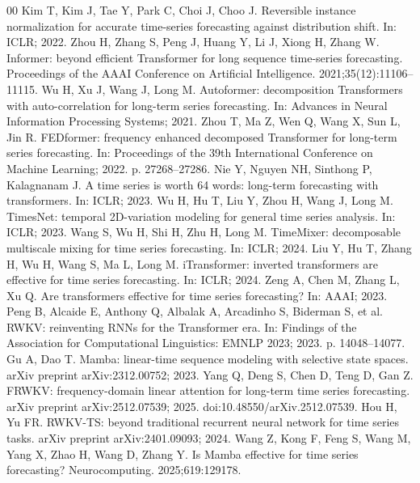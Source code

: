 \documentclass[a4paper,fleqn]{cas-sc}
\begin{document}
\begin{thebibliography}{00}
 Kim T, Kim J, Tae Y, Park C, Choi J, Choo J. Reversible instance normalization for accurate time-series forecasting against distribution shift. In: ICLR; 2022.
 Zhou H, Zhang S, Peng J, Huang Y, Li J, Xiong H, Zhang W. Informer: beyond efficient Transformer for long sequence time-series forecasting. Proceedings of the AAAI Conference on Artificial Intelligence. 2021;35(12):11106--11115.
 Wu H, Xu J, Wang J, Long M. Autoformer: decomposition Transformers with auto-correlation for long-term series forecasting. In: Advances in Neural Information Processing Systems; 2021.
 Zhou T, Ma Z, Wen Q, Wang X, Sun L, Jin R. FEDformer: frequency enhanced decomposed Transformer for long-term series forecasting. In: Proceedings of the 39th International Conference on Machine Learning; 2022. p. 27268--27286.
 Nie Y, Nguyen NH, Sinthong P, Kalagnanam J. A time series is worth 64 words: long-term forecasting with transformers. In: ICLR; 2023.
 Wu H, Hu T, Liu Y, Zhou H, Wang J, Long M. TimesNet: temporal 2D-variation modeling for general time series analysis. In: ICLR; 2023.
 Wang S, Wu H, Shi H, Zhu H, Long M. TimeMixer: decomposable multiscale mixing for time series forecasting. In: ICLR; 2024.
 Liu Y, Hu T, Zhang H, Wu H, Wang S, Ma L, Long M. iTransformer: inverted transformers are effective for time series forecasting. In: ICLR; 2024.
 Zeng A, Chen M, Zhang L, Xu Q. Are transformers effective for time series forecasting? In: AAAI; 2023.
 Peng B, Alcaide E, Anthony Q, Albalak A, Arcadinho S, Biderman S, et al. RWKV: reinventing RNNs for the Transformer era. In: Findings of the Association for Computational Linguistics: EMNLP 2023; 2023. p. 14048--14077.
 Gu A, Dao T. Mamba: linear-time sequence modeling with selective state spaces. arXiv preprint arXiv:2312.00752; 2023.
 Yang Q, Deng S, Chen D, Teng D, Gan Z. FRWKV: frequency-domain linear attention for long-term time series forecasting. arXiv preprint arXiv:2512.07539; 2025. doi:10.48550/arXiv.2512.07539.
 Hou H, Yu FR. RWKV-TS: beyond traditional recurrent neural network for time series tasks. arXiv preprint arXiv:2401.09093; 2024.
 Wang Z, Kong F, Feng S, Wang M, Yang X, Zhao H, Wang D, Zhang Y. Is Mamba effective for time series forecasting? Neurocomputing. 2025;619:129178.

\end{thebibliography}
\end{document}
